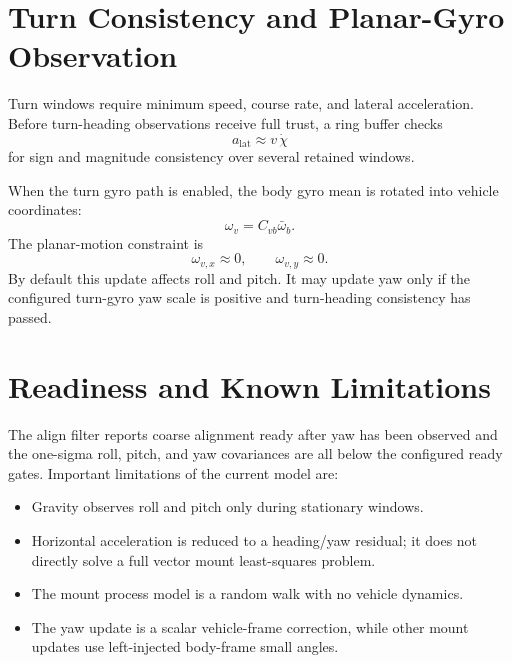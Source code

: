 \documentclass[11pt]{article}
\begin{document}
\section{Turn Consistency and Planar-Gyro Observation}

Turn windows require minimum speed, course rate, and lateral acceleration.
Before turn-heading observations receive full trust, a ring buffer checks
\begin{equation}
  a_{\mathrm{lat}}\approx v\,\dot\chi
\end{equation}
for sign and magnitude consistency over several retained windows.

When the turn gyro path is enabled, the body gyro mean is rotated into vehicle
coordinates:
\begin{equation}
  \omega_v=C_{vb}\bar\omega_b .
\end{equation}
The planar-motion constraint is
\begin{equation}
  \omega_{v,x}\approx 0,\qquad \omega_{v,y}\approx 0.
\end{equation}
By default this update affects roll and pitch. It may update yaw only if the
configured turn-gyro yaw scale is positive and turn-heading consistency has
passed.

\section{Readiness and Known Limitations}

The align filter reports coarse alignment ready after yaw has been observed and
the one-sigma roll, pitch, and yaw covariances are all below the configured
ready gates. Important limitations of the current model are:
\begin{itemize}[leftmargin=1.5em]
\item Gravity observes roll and pitch only during stationary windows.
\item Horizontal acceleration is reduced to a heading/yaw residual; it does not
directly solve a full vector mount least-squares problem.
\item The mount process model is a random walk with no vehicle dynamics.
\item The yaw update is a scalar vehicle-frame correction, while other mount
updates use left-injected body-frame small angles.
\end{itemize}
\end{document}
